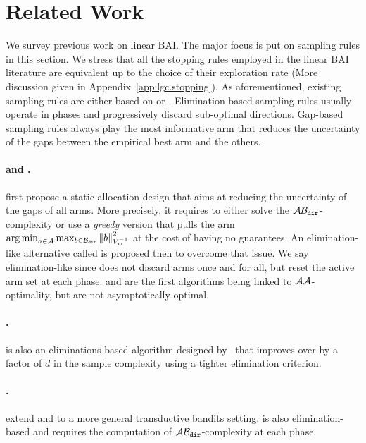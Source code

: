 \section{Related Work}\label{sec:lgc.related_work}

We survey previous work on linear BAI. The major focus is put on sampling rules in this section. We stress that all the stopping rules employed in the linear BAI literature are equivalent up to the choice of their exploration rate (More discussion given in Appendix~\ref{app:lgc.stopping}). As aforementioned, existing sampling rules are either based on \SE or \UGapE. Elimination-based sampling rules usually operate in phases and progressively discard sub-optimal directions. Gap-based sampling rules always play the most informative arm that reduces the uncertainty of the gaps between the empirical best arm and the others.

\paragraph{\XYS and \XYA.} \citet{soare2014linear} first propose a static allocation design \XYS that aims at reducing the uncertainty of the gaps of all arms. More precisely, it requires to either solve the $\mathcal{A}\mathcal{B}_{\texttt{dir}}$-complexity or use a \emph{greedy} version that pulls the arm $\operatorname*{arg\,min}_{a\in\mathcal{A}} \max_{b\in\mathcal{B}_{\texttt{dir}}} \left\lVert b\right\rVert_{V_w^{-1}}^2$ at the cost of having no guarantees. An elimination-like alternative called \XYA is proposed then to overcome that issue. We say elimination-like since \XYA does not discard arms once and for all, but reset the active arm set at each phase. \XYA and \XYS are the first algorithms being linked to $\mathcal{A}\mathcal{A}$-optimality, but are not asymptotically optimal.


\vspace{-0.2cm}
\paragraph{\ALBA.} \ALBA is also an eliminations-based algorithm designed by~\citet{tao2018alba} that improves over \XYA by a factor of $d$ in the sample complexity using a tighter elimination criterion.
\vspace{-0.2cm}

\paragraph{\RAGE.} \citet{fiez2019transductive} extend \XYS and \XYA to a more general transductive bandits setting. \RAGE is also elimination-based and requires the computation of $\mathcal{A}\mathcal{B}_{\texttt{dir}}$-complexity at each phase.
\vspace{-0.2cm}

